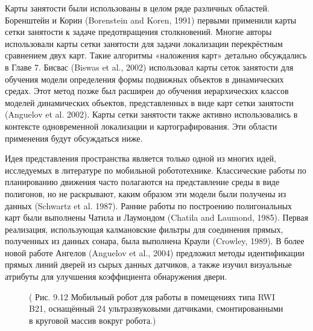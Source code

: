 \documentclass[10pt,a4paper]{article}
\begin{document}
Карты занятости были использованы в целом ряде различных областей. Боренштейн и Корин (Borenstein and Koren, 1991) первыми применили карты сетки занятости к задаче предотвращения столкновений. Многие авторы использовали карты сетки занятости для задачи локализации перекрёстным сравнением двух карт. Такие алгоритмы «наложения карт» детально обсуждались в Главе 7. Бисвас (Biswas et al., 2002) использовал карты сеток занятости для обучения модели определения формы подвижных объектов в динамических средах. Этот метод позже был расширен до обучения иерархических классов моделей динамических объектов, представленных в виде карт сетки занятости (Anguelov et al. 2002). Карты сетки занятости также активно использовались в контексте одновременной локализации и картографирования. Эти области применения будут обсуждаться ниже.

Идея представления пространства является только одной из многих идей, исследуемых в литературе по мобильной робототехнике. Классические работы по планированию движения часто полагаются на представление среды в виде полигонов, но не раскрывают, каким образом эти модели были получены из данных (Schwartz et al. 1987). Ранние работы по построению полигональных карт были выполнены Чатила и Лаумондом (Chatila and Laumond, 1985). Первая реализация, использующая калмановские фильтры для соединения прямых, полученных из данных сонара, была выполнена Краули (Crowley, 1989). В более новой работе Ангелов (Anguelov et al., 2004) предложил методы идентификации прямых линий дверей из сырых данных датчиков, а также изучил визуальные атрибуты для улучшения коэффициента обнаружения двери.

\begin{figure}[H]
	\caption{ ( Рис. 9.12 Мобильный робот для работы в помещениях типа RWI B21, оснащённый 24 ультразвуковыми датчиками, смонтированными в круговой массив вокруг робота.)}
	\label{fig:912orig}
\end{figure}
\end{document}
